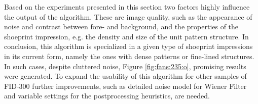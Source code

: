\documentclass[draft,final]{vutinfth} %
\begin{document}
Based on the experiments presented in this section two factors highly influence the output of the algorithm.
These are image quality, such as the appearance of noise and contrast between fore- and background, and the properties of the shoeprint impression, e.g. the density and size of the unit pattern structure.
In conclusion, this algorithm is specialized in a given type of shoeprint impressions in its current form, namely the ones with dense patterns or fine-lined structures. 
In such cases, despite cluttered noise, Figure \ref{fig:fans:235:o}, promising results were generated.
To expand the usability of this algorithm for other samples of FID-300 further improvements, such as detailed noise model for Wiener Filter and variable settings for the postprocessing heuristics, are needed. 


\begin{figure}[H]



\end{figure}
\end{document}

